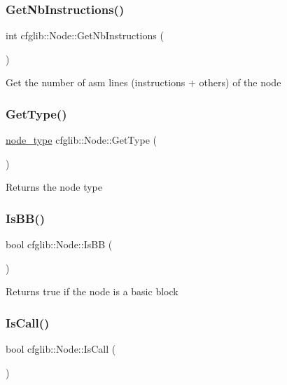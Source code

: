 \subsubsection{\texorpdfstring{Get\+Nb\+Instructions()}{GetNbInstructions()}}
{\footnotesize\ttfamily int cfglib\+::\+Node\+::\+Get\+Nb\+Instructions (\begin{DoxyParamCaption}{ }\end{DoxyParamCaption})\hspace{0.3cm}{\ttfamily [inline]}}

Get the number of asm lines (instructions + others) of the node \mbox{\label{classcfglib_1_1Node_a92716d47e55c6808c641ac2fab7e26e2}} 
\subsubsection{\texorpdfstring{Get\+Type()}{GetType()}}
{\footnotesize\ttfamily \hyperlink{namespacecfglib_a44952a45d827aaa271f7e7dac5bf7752}{node\+\_\+type} cfglib\+::\+Node\+::\+Get\+Type (\begin{DoxyParamCaption}{ }\end{DoxyParamCaption})\hspace{0.3cm}{\ttfamily [inline]}}

Returns the node type \mbox{\label{classcfglib_1_1Node_a2813d33e1f4b848f6f14f2744cb17dfe}} 
\subsubsection{\texorpdfstring{Is\+B\+B()}{IsBB()}}
{\footnotesize\ttfamily bool cfglib\+::\+Node\+::\+Is\+BB (\begin{DoxyParamCaption}{ }\end{DoxyParamCaption})}

Returns true if the node is a basic block \mbox{\label{classcfglib_1_1Node_a544488e1ba481dae0d55f2b826ac84a9}} 
\subsubsection{\texorpdfstring{Is\+Call()}{IsCall()}}
{\footnotesize\ttfamily bool cfglib\+::\+Node\+::\+Is\+Call (\begin{DoxyParamCaption}{ }\end{DoxyParamCaption})}

